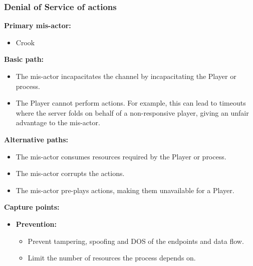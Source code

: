 \documentclass[a4paper,11pt]{report}
\begin{document}
\subsubsection{Denial of Service of actions}
\label{PlayerFlowCasesD3}
\textbf{Primary mis-actor:}
\begin{itemize}
\item Crook
\end{itemize}
\textbf{Basic path:}
\begin{itemize}
\item The mis-actor incapacitates the channel by incapacitating the Player or process.
\item The Player cannot perform actions. For example, this can lead to timeouts where the server folds on behalf of a non-responsive player, giving an unfair advantage to the mis-actor.
\end{itemize}
\textbf{Alternative paths:}
\begin{itemize}
\item The mis-actor consumes resources required by the Player or process.
\item The mis-actor corrupts the actions.
\item The mis-actor pre-plays actions, making them unavailable for a Player.
\end{itemize}
\textbf{Capture points:}
\begin{itemize}
\item \textbf{Prevention:}
\begin{itemize}
\item Prevent tampering, spoofing and DOS of the endpoints and data flow.
\item Limit the number of resources the process depends on.
\end{itemize}
\end{itemize}
\end{document}
